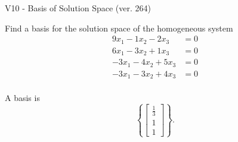 \begin{exercise}
  \begin{exerciseTitle}V10 - Basis of Solution Space (ver. 264)\end{exerciseTitle}
  \begin{exerciseStatement}
    Find a basis for the solution space of the homogeneous system 
\begin{align*}
 9 x_ 1 -1 x_ 2 -2 x_ 3 &= 0  \\ 
  6 x_ 1 -3 x_ 2 + 1 x_ 3 &= 0  \\ 
  -3 x_ 1 -4 x_ 2 + 5 x_ 3 &= 0  \\ 
  -3 x_ 1 -3 x_ 2 + 4 x_ 3 &= 0  \\ 
 \end{align*}


 
  \end{exerciseStatement}

  \begin{exerciseAnswer}
   A basis is   
\[\left\{\left[\begin{array}{c}
\frac{1}{3} \\
1 \\
1
\end{array}\right]\right\}.\]

  


  \end{exerciseAnswer}
\end{exercise}